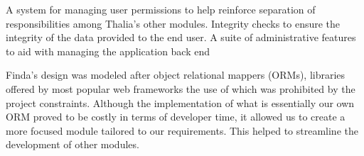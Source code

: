 \documentclass[main.tex]{subfiles}
\begin{document}
A system for managing user permissions to help reinforce separation of responsibilities among Thalia's other modules. 
Integrity checks to ensure the integrity of the data provided to the end user. 
A suite of administrative features to aid with managing the application back end

Finda's design was modeled after object relational mappers (ORMs), libraries offered by most popular web frameworks the use of which was prohibited by the project constraints. Although the implementation of what is essentially our own ORM proved to be costly in terms of developer time, it allowed us to create a more focused module tailored to our requirements. This helped to streamline the development of other modules.
\end{document}
